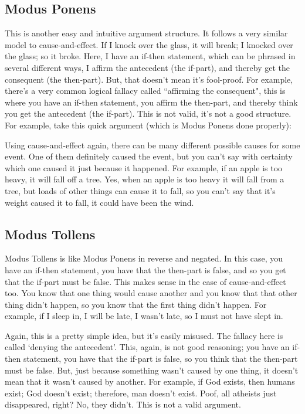 \subsection{Modus Ponens}
\label{s:p1.3.1}

This is another easy and intuitive argument structure. It follows a very similar model to cause-and-effect. If I knock over the glass, it will break; I knocked over the glass; so it broke. Here, I have an if-then statement, which can be phrased in several different ways, I affirm the antecedent (the if-part), and thereby get the consequent (the then-part). But, that doesn't mean it's fool-proof. For example, there's a very common logical fallacy called ``affirming the consequent", this is where you have an if-then statement, you affirm the then-part, and thereby think you get the antecedent (the if-part). This is not valid, it's not a good structure. For example, take this quick argument (which is Modus Ponens done properly):


Using cause-and-effect again, there can be many different possible causes for some event. One of them definitely caused the event, but you can't say with certainty which one caused it just because it happened. For example, if an apple is too heavy, it will fall off a tree. Yes, when an apple is too heavy it will fall from a tree, but loads of other things can cause it to fall, so you can't say that it's weight caused it to fall, it could have been the wind.

\subsection{Modus Tollens}
\label{s:p1.3.2}

Modus Tollens is like Modus Ponens in reverse and negated. In this case, you have an if-then statement, you have that the then-part is false, and so you get that the if-part must be false. This makes sense in the case of cause-and-effect too. You know that one thing would cause another and you know that that other thing didn't happen, so you know that the first thing didn't happen. For example, if I sleep in, I will be late, I wasn't late, so I must not have slept in. 

Again, this is a pretty simple idea, but it's easily misused. The fallacy here is called `denying the antecedent'. This, again, is not good reasoning; you have an if-then statement, you have that the if-part is false, so you think that the then-part must be false. But, just because something wasn't caused by one thing, it doesn't mean that it wasn't caused by another. For example, if God exists, then humans exist; God doesn't exist; therefore, man doesn't exist. Poof, all atheists  just disappeared, right? No, they didn't. This is not a valid argument. 

